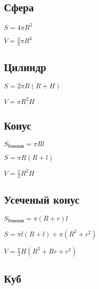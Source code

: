 \subsection{Сфера}

$ S = 4 \pi R^2 $ 

$ V = \frac{3}{4} \pi R^3 $

\subsection{Цилиндр}

$ S = 2 \pi R (R+H) $

$ V = \pi R^2 H $

\subsection{Конус}

$ S_{\text{боковая}} = \pi R l $

$ S = \pi R (R + l) $

$ V = \frac{\pi}{3} R^2 H $

\subsection{Усеченый конус}

$ S_{\text{боковая}} = \pi (R+r) l $

$ S = \pi l (R + l) + \pi (R^2 + r^2) $

$ V = \frac{\pi}{3} H (R^2 + Rr + r^2) $

\subsection{Куб}